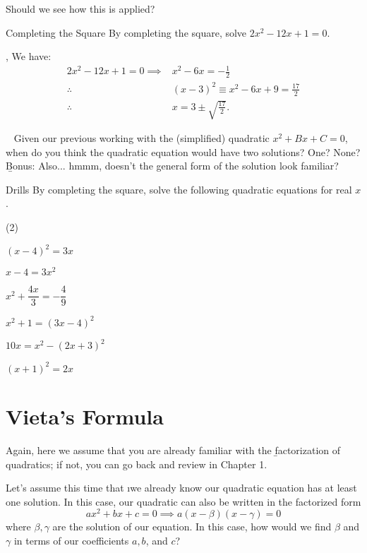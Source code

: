Should we see how this is applied?

\newpage\begin{example}{Completing the Square}
By completing the square, solve $2x^2-12x+1=0$.

\sep
We have:
\begin{align}
    2x^2-12x+1=0\implies& x^2-6x=-\frac12 \\
    \therefore\ & (x-3)^2\equiv x^2-6x+9=\frac{17}2 \\
    \therefore\ & x=3\pm\sqrt{\frac{17}{2}}.
\end{align}

\end{example}

\begin{thinking}{~}
Given our previous working with the (simplified) quadratic $x^2+Bx+C=0$, when do you think the quadratic equation would have two solutions? One? None? \b{Bonus:} Also... hmmm, doesn't the general form of the solution look familiar?
\end{thinking}
\begin{questions}{Drills}
By completing the square, solve the following quadratic equations for real $x$.
\begin{question_set}(2)
    \item $(x-4)^2=3x$
    \item $x-4=3x^2$
    \item $x^2+\dfrac{4x}{3}=-\dfrac{4}{9}$
    \item $x^2+1=(3x-4)^2$
    \item $10x=x^2-(2x+3)^2$
    \item $(x+1)^2=2x$
\end{question_set}
\end{questions}


\section{Vieta's Formula}
Again, here we assume that you are already familiar with the \b{factorization} of quadratics; if not, you can go back and review in Chapter 1.

Let's assume this time that \i{we already know our quadratic equation has at least one solution}. In this case, our quadratic can also be written in the factorized form
\begin{equation*}
    ax^2+bx+c=0\implies a(x - \beta)(x - \gamma) = 0
\end{equation*}
where $\beta,\gamma$ are the solution of our equation. In this case, how would we find $\beta$ and $\gamma$ in terms of our coefficients $a, b$, and $c$?

